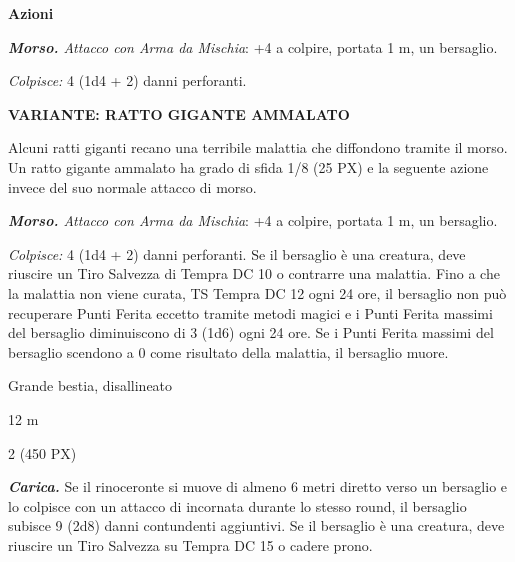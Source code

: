 \begin{multicols}{2}
{\textbf{Azioni}

\emph{\textbf{Morso.} Attacco con Arma da Mischia}: +4 a colpire, portata 1 m, un bersaglio.

\emph{Colpisce:} 4 (1d4 + 2) danni perforanti.

\medskip

\textbf{VARIANTE: RATTO GIGANTE AMMALATO}
\hypertarget{Ratto Gigante ammalato}{}

Alcuni ratti giganti recano una terribile malattia che diffondono tramite il morso. Un ratto gigante ammalato ha grado di sfida 1/8 (25 PX) e la seguente azione invece del suo normale attacco di morso.

\emph{\textbf{Morso.} Attacco con Arma da Mischia}: +4 a colpire, portata 1 m, un bersaglio.

\emph{Colpisce:} 4 (1d4 + 2) danni perforanti. Se il bersaglio è una creatura, deve riuscire un Tiro Salvezza di Tempra DC 10 o contrarre una malattia. Fino a che la malattia non viene curata, TS Tempra DC 12 ogni 24 ore, il bersaglio non può recuperare Punti Ferita eccetto tramite metodi magici e i Punti Ferita massimi del bersaglio diminuiscono di 3 (1d6) ogni 24 ore. Se i Punti Ferita massimi del bersaglio scendono a 0 come risultato della malattia, il bersaglio muore.

\begin{description}[noitemsep, topsep=0pt, parsep=0pt, partopsep=0pt, itemsep=1pt, leftmargin=2.35cm,  labelwidth=2.2cm, itemindent=0cm, listparindent=0pt] %
\setlength{\baselineskip}{10pt}
\item[\textbf{Taglia/Tipo}] Grande bestia, disallineato
\item[\textbf{Caratt.}] 
\item[\textbf{Punti Ferita}] 
\item[\textbf{Tiri Salvez.}] 
\item[\textbf{Movimento}] 12 m
\item[\textbf{Sfida}] 2 (450 PX)
\end{description}
\smallskip

\emph{\textbf{Carica.}} Se il rinoceronte si muove di almeno 6 metri diretto verso un bersaglio e lo colpisce con un attacco di incornata durante lo stesso round, il bersaglio subisce 9 (2d8) danni contundenti aggiuntivi. Se il bersaglio è una creatura, deve riuscire un Tiro Salvezza su Tempra DC 15 o cadere prono.

}
\end{multicols}
